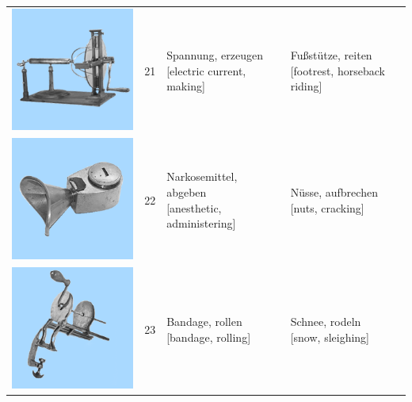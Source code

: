 \documentclass[
  english,
  man,floatsintext]{apa7}
\begin{document}
\begin{center}
\begin{ThreePartTable}
{\begin{longtable}{llll}
\includegraphics[valign=c, scale=0.23]{../materials/unfamiliar/21.png} & 21 & \makecell[l]{Spannung, erzeugen\\{[electric current, making]}} & \makecell[l]{Fußstütze, reiten\\{[footrest, horseback riding]}}\\
\includegraphics[valign=c, scale=0.23]{../materials/unfamiliar/22.png} & 22 & \makecell[l]{Narkosemittel, abgeben\\{[anesthetic, administering]}} & \makecell[l]{Nüsse, aufbrechen\\{[nuts, cracking]}}\\
\includegraphics[valign=c, scale=0.23]{../materials/unfamiliar/23.png} & 23 & \makecell[l]{Bandage, rollen\\{[bandage, rolling]}} & \makecell[l]{Schnee, rodeln\\{[snow, sleighing]}}\\

\end{longtable}}
\end{ThreePartTable}
\end{center}
\end{document}
